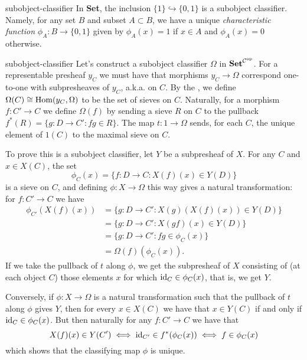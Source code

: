 \begin{example}{subobject-classifier}
    In \textbf{Set}, the inclusion $\{ 1 \} \hookrightarrow \{ 0, 1 \}$ is a subobject classifier. Namely, for any set $B$ and subset $A \subset B$, we have a unique \textit{characteristic function} $\phi_A \colon B \to \{ 0, 1 \}$ given by $\phi_A(x) = 1$ if $x \in A$ and $\phi_A(x) = 0$ otherwise.
\end{example}

\begin{example}{subobject-classifier}
    Let's construct a subobject classifier $\Omega$ in $\textbf{Set}^{\mathcal{C}^\textup{op}}$. For a representable presheaf $y_C$ we must have that morphisms $y_C \to \Omega$ correspond one-to-one with subpresheaves of $y_C$, a.k.a.  on $C$. By the , we define $\Omega(C) \cong \operatorname{Hom}(y_C, \Omega)$ to be the set of sieves on $C$. Naturally, for a morphism $f \colon C' \to C$ we define $\Omega(f)$ by sending a sieve $R$ on $C$ to the pullback $f^*(R) = \{ g \colon D \to C' \colon fg \in R \}$. The map $t \colon 1 \to \Omega$ sends, for each $C$, the unique element of $1(C)$ to the maximal sieve on $C$.
    
    To prove this is a subobject classifier, let $Y$ be a subpresheaf of $X$. For any $C$ and $x \in X(C)$, the set
    \[ \phi_C(x) = \{ f \colon D \to C : X(f)(x) \in Y(D) \} \]
    is a sieve on $C$, and defining $\phi \colon X \to \Omega$ this way gives a natural transformation: for $f \colon C' \to C$ we have
    \[ \begin{aligned}
        \phi_{C'}(X(f)(x))
            &= \{ g \colon D \to C' : X(g)(X(f)(x)) \in Y(D) \} \\
            &= \{ g \colon D \to C' : X(gf)(x) \in Y(D) \} \\
            &= \{ g \colon D \to C' : fg \in \phi_C(x) \} \\
            &= \Omega(f)(\phi_C(x)) .
    \end{aligned} \]
    If we take the pullback of $t$ along $\phi$, we get the subpresheaf of $X$ consisting of (at each object $C$) those elements $x$ for which $\textup{id}_C \in \phi_C(x)$, that is, we get $Y$.
    
    Conversely, if $\phi \colon X \to \Omega$ is a natural transformation such that the pullback of $t$ along $\phi$ gives $Y$, then for every $x \in X(C)$ we have that $x \in Y(C)$ if and only if $\textup{id}_C \in \phi_C(x)$. But then naturally for any $f \colon C' \to C$ we have that
    \[ X(f)(x) \in Y(C') \iff \textup{id}_{C'} \in f^*(\phi_C(x)) \iff f \in \phi_C(x) \]
    which shows that the classifying map $\phi$ is unique.
\end{example}

